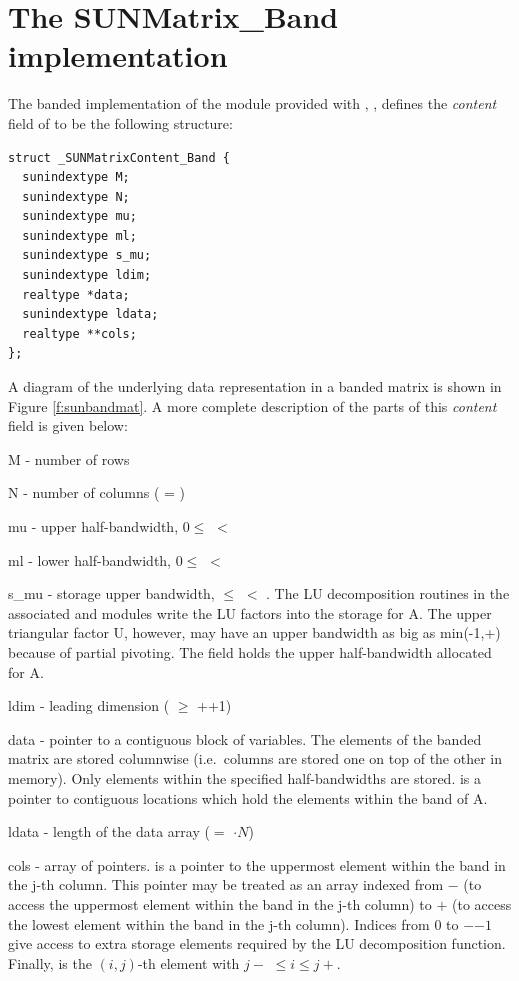 \section{The SUNMatrix\_Band implementation}\label{ss:sunmat_band}

The banded implementation of the {\sunmatrix} module provided with
{\sundials}, {\sunmatband}, defines the {\em content} field
of  to be the following structure:
\begin{verbatim}
struct _SUNMatrixContent_Band {
  sunindextype M;
  sunindextype N;
  sunindextype mu;
  sunindextype ml;
  sunindextype s_mu;
  sunindextype ldim;
  realtype *data;
  sunindextype ldata;
  realtype **cols;
};
\end{verbatim}
A diagram of the underlying data representation in a banded matrix is
shown in Figure \ref{f:sunbandmat}.  A more complete description of the
parts of this \emph{content} field is given below:
\begin{args}[ldata]
  \item[M] - number of rows
  \item[N] - number of columns ( = )
  \item[mu] - upper half-bandwidth, $0 \le$  $<$ 
  \item[ml] - lower half-bandwidth, $0 \le$  $<$ 
  \item[s\_mu] - storage upper bandwidth,  $\le$  $<$ .
    The LU decomposition routines in the associated {\sunlinsolband}
    and {\sunlinsollapband} modules write the LU factors into the
    storage for A. The upper triangular factor U, however, may have
    an upper bandwidth as big as min(-1,+) because of
    partial pivoting. The  field holds the upper
  half-bandwidth allocated for A.
  \item[ldim] - leading dimension ( $\ge$ ++1)
  \item[data] - pointer to a contiguous block of  variables.
    The elements of the banded matrix are stored columnwise
    (i.e.~columns are stored one on top of the other in memory). Only
    elements within the specified half-bandwidths are stored.
     is a pointer to  contiguous locations
    which hold the elements within the band of A.
  \item[ldata] - length of the data array
    ($=$ $\cdot N$)
  \item[cols] - array of pointers.  is a pointer to the
    uppermost element within the band in the j-th column. This pointer
    may be treated as an array indexed from $-$ (to
    access the uppermost element within the band in the j-th column)
    to $+$ (to access the lowest element within the
    band in the j-th column). Indices from $0$ to
    $-$$-1$ give access to extra storage elements
    required by the LU decomposition function.
    Finally,  is the $(i,j)$-th element with
    $j-$ $\le i \le j+$.
\end{args}
